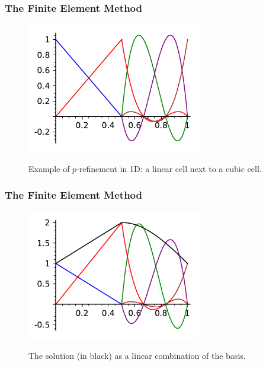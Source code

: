 \documentclass[8pt]{beamer}
\begin{document}
\begin{frame}
    \frametitle{The Finite Element Method}

    \begin{figure}
        \includegraphics[width=3in]{p-refinement.pdf}

        Example of \(p\)-refinement in 1D: a linear cell next to a cubic cell.
    \end{figure}
\end{frame}

\begin{frame}
    \frametitle{The Finite Element Method}

    \begin{figure}
        \includegraphics[width=3in]{p-refinement-interpolate.pdf}

        The solution (in black) as a linear combination of the basis.
    \end{figure}
\end{frame}
\end{document}
